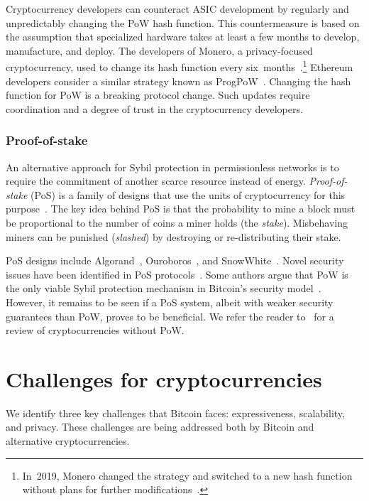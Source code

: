 Cryptocurrency developers can counteract ASIC development by regularly and unpredictably changing the PoW hash function.
This countermeasure is based on the assumption that specialized hardware takes at least a few months to develop, manufacture, and deploy.
The developers of Monero, a privacy-focused cryptocurrency, used to change its hash function every six~months~\cite{Kim2019}.\footnote{In~2019, Monero changed the strategy and switched to a new hash function without plans for further modifications~\cite{dEBRUYNE2019}.}
Ethereum developers consider a similar strategy known as ProgPoW~\cite{OLeary2019}.
Changing the hash function for PoW is a breaking protocol change.
Such updates require coordination and a degree of trust in the cryptocurrency developers.


\subsubsection*{Proof-of-stake}

An alternative approach for Sybil protection in permissionless networks is to require the commitment of another scarce resource instead of energy.
\textit{Proof-of-stake} (PoS) is a family of designs that use the units of cryptocurrency for this purpose~\cite{Bano2019}.
The key idea behind PoS is that the probability to mine a block must be proportional to the number of coins a miner holds (the \textit{stake}).
Misbehaving miners can be punished (\textit{slashed}) by destroying or re-distributing their stake.


PoS designs include Algorand~\cite{Chen2019}, Ouroboros~\cite{Kiayias2017}, and SnowWhite~\cite{Bentov2016a}.
Novel security issues have been identified in PoS protocols~\cite{Fanti2019,Gazi2018,BrownCohen2019,Chitra2020}.
Some authors argue that PoW is the only viable Sybil protection mechanism in Bitcoin's security model~\cite{Andreev2014, Sztorc2015, Poelstra2015}.
However, it remains to be seen if a PoS system, albeit with weaker security guarantees than PoW, proves to be beneficial.
We refer the reader to~\cite{Bentov2016} for a review of cryptocurrencies without PoW.


\section{Challenges for cryptocurrencies}

We identify three key challenges that Bitcoin faces: expressiveness, scalability, and privacy.
These challenges are being addressed both by Bitcoin and alternative cryptocurrencies.


